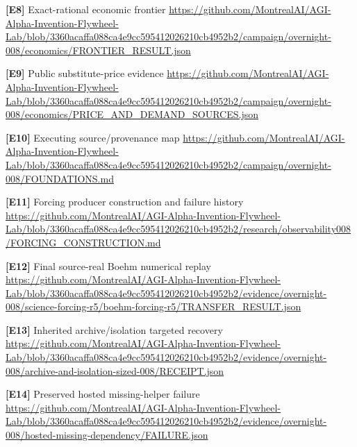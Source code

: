\documentclass[11pt,letterpaper]{article}
\begin{document}
\begin{samepage}
\small\textbf{[E8]} Exact-rational economic frontier \url{https://github.com/MontrealAI/AGI-Alpha-Invention-Flywheel-Lab/blob/3360acaffa088ca4e9cc595412026210cb4952b2/campaign/overnight-008/economics/FRONTIER_RESULT.json}\par
\normalsize
\end{samepage}
\begin{samepage}
\small\textbf{[E9]} Public substitute-price evidence \url{https://github.com/MontrealAI/AGI-Alpha-Invention-Flywheel-Lab/blob/3360acaffa088ca4e9cc595412026210cb4952b2/campaign/overnight-008/economics/PRICE_AND_DEMAND_SOURCES.json}\par
\normalsize
\end{samepage}
\begin{samepage}
\small\textbf{[E10]} Executing source/provenance map \url{https://github.com/MontrealAI/AGI-Alpha-Invention-Flywheel-Lab/blob/3360acaffa088ca4e9cc595412026210cb4952b2/campaign/overnight-008/FOUNDATIONS.md}\par
\normalsize
\end{samepage}
\begin{samepage}
\small\textbf{[E11]} Forcing producer construction and failure history \url{https://github.com/MontrealAI/AGI-Alpha-Invention-Flywheel-Lab/blob/3360acaffa088ca4e9cc595412026210cb4952b2/research/observability008/FORCING_CONSTRUCTION.md}\par
\normalsize
\end{samepage}
\begin{samepage}
\small\textbf{[E12]} Final source-real Boehm numerical replay \url{https://github.com/MontrealAI/AGI-Alpha-Invention-Flywheel-Lab/blob/3360acaffa088ca4e9cc595412026210cb4952b2/evidence/overnight-008/science-forcing-r5/boehm-forcing-r5/TRANSFER_RESULT.json}\par
\normalsize
\end{samepage}
\begin{samepage}
\small\textbf{[E13]} Inherited archive/isolation targeted recovery \url{https://github.com/MontrealAI/AGI-Alpha-Invention-Flywheel-Lab/blob/3360acaffa088ca4e9cc595412026210cb4952b2/evidence/overnight-008/archive-and-isolation-sized-008/RECEIPT.json}\par
\normalsize
\end{samepage}
\begin{samepage}
\small\textbf{[E14]} Preserved hosted missing-helper failure \url{https://github.com/MontrealAI/AGI-Alpha-Invention-Flywheel-Lab/blob/3360acaffa088ca4e9cc595412026210cb4952b2/evidence/overnight-008/hosted-missing-dependency/FAILURE.json}\par
\normalsize
\end{samepage}
\end{document}
